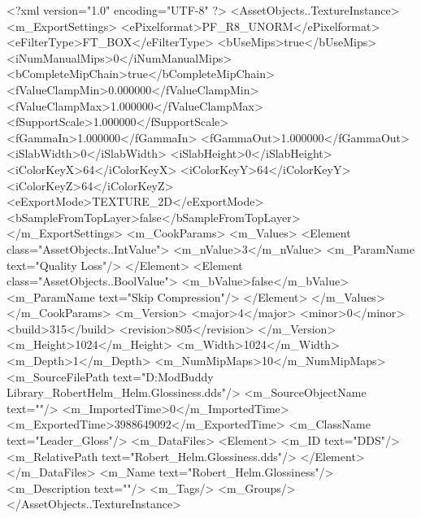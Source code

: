<?xml version="1.0" encoding="UTF-8" ?>
<AssetObjects..TextureInstance>
	<m_ExportSettings>
		<ePixelformat>PF_R8_UNORM</ePixelformat>
		<eFilterType>FT_BOX</eFilterType>
		<bUseMips>true</bUseMips>
		<iNumManualMips>0</iNumManualMips>
		<bCompleteMipChain>true</bCompleteMipChain>
		<fValueClampMin>0.000000</fValueClampMin>
		<fValueClampMax>1.000000</fValueClampMax>
		<fSupportScale>1.000000</fSupportScale>
		<fGammaIn>1.000000</fGammaIn>
		<fGammaOut>1.000000</fGammaOut>
		<iSlabWidth>0</iSlabWidth>
		<iSlabHeight>0</iSlabHeight>
		<iColorKeyX>64</iColorKeyX>
		<iColorKeyY>64</iColorKeyY>
		<iColorKeyZ>64</iColorKeyZ>
		<eExportMode>TEXTURE_2D</eExportMode>
		<bSampleFromTopLayer>false</bSampleFromTopLayer>
	</m_ExportSettings>
	<m_CookParams>
		<m_Values>
			<Element class="AssetObjects..IntValue">
				<m_nValue>3</m_nValue>
				<m_ParamName text="Quality Loss"/>
			</Element>
			<Element class="AssetObjects..BoolValue">
				<m_bValue>false</m_bValue>
				<m_ParamName text="Skip Compression"/>
			</Element>
		</m_Values>
	</m_CookParams>
	<m_Version>
		<major>4</major>
		<minor>0</minor>
		<build>315</build>
		<revision>805</revision>
	</m_Version>
	<m_Height>1024</m_Height>
	<m_Width>1024</m_Width>
	<m_Depth>1</m_Depth>
	<m_NumMipMaps>10</m_NumMipMaps>
	<m_SourceFilePath text="D:\MyDocuments\Firaxis ModBuddy Library\RobertTywin\Leader_Robert\Unfolded Helm\Robert_Helm.Glossiness.dds"/>
	<m_SourceObjectName text=""/>
	<m_ImportedTime>0</m_ImportedTime>
	<m_ExportedTime>3988649092</m_ExportedTime>
	<m_ClassName text="Leader_Gloss"/>
	<m_DataFiles>
		<Element>
			<m_ID text="DDS"/>
			<m_RelativePath text="Robert_Helm.Glossiness.dds"/>
		</Element>
	</m_DataFiles>
	<m_Name text="Robert_Helm.Glossiness"/>
	<m_Description text=""/>
	<m_Tags/>
	<m_Groups/>
</AssetObjects..TextureInstance>

